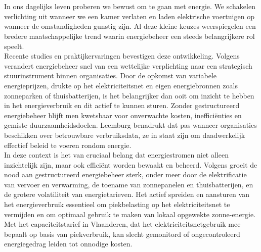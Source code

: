 
\chapter{}%
\label{ch:inleiding}

\noindent
In ons dagelijks leven proberen we bewust om te gaan met energie. We schakelen verlichting uit wanneer we een kamer verlaten en laden elektrische voertuigen op wanneer de omstandigheden gunstig zijn. Al deze kleine keuzes weerspiegelen een bredere maatschappelijke trend waarin energiebeheer een steeds belangrijkere rol speelt. \\

Recente studies en praktijkervaringen bevestigen deze ontwikkeling. Volgens \autocite{Heydari2023} verandert energiebeheer snel van een wettelijke verplichting naar een strategisch stuurinstrument binnen organisaties. Door de opkomst van variabele energieprijzen, drukte op het elektriciteitsnet en eigen energiebronnen zoals zonneparken of thuisbatterijen, is het belangrijker dan ooit om inzicht te hebben in het energieverbruik en dit actief te kunnen sturen. Zonder gestructureerd energiebeheer blijft men kwetsbaar voor onverwachte kosten, inefficiënties en gemiste duurzaamheidsdoelen. Leemburg benadrukt dat pas wanneer organisaties beschikken over betrouwbare verbruiksdata, ze in staat zijn om daadwerkelijk effectief beleid te voeren rondom energie.\\

\noindent
In deze context is het van cruciaal belang dat energiestromen niet alleen inzichtelijk zijn, maar ook efficiënt worden bewaakt en beheerd. Volgens \textcite{Rafique2017} groeit de nood aan gestructureerd energiebeheer sterk, onder meer door de elektrificatie van vervoer en verwarming, de toename van zonnepanelen en thuisbatterijen, en de grotere volatiliteit van energietarieven. 
Het actief spreiden en aansturen van het energieverbruik essentieel om piekbelasting op het elektriciteitsnet te vermijden en om optimaal gebruik te maken van lokaal opgewekte zonne-energie. Met het capaciteitstarief in Vlaanderen, dat het elektriciteitsnetgebruik mee bepaalt op basis van piekverbruik, kan slecht gemonitord of ongecontroleerd energiegedrag leiden tot onnodige kosten. \\

